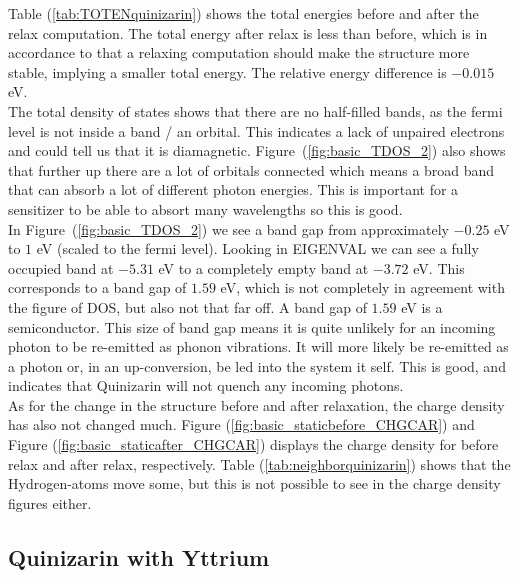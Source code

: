 \documentclass{article}
\begin{document}
    Table (\ref{tab:TOTENquinizarin}) shows the total energies before and after the relax computation. The total energy after relax is less than before, which is in accordance to that a relaxing computation should make the structure more stable, implying a smaller total energy. The relative energy difference is $-0.015$ eV. \\

    The total density of states shows that there are no half-filled bands, as the fermi level is not inside a band / an orbital. This indicates a lack of unpaired electrons and could tell us that it is diamagnetic. Figure~(\ref{fig:basic_TDOS_2}) also shows that further up there are a lot of orbitals connected which means a broad band that can absorb a lot of different photon energies. This is important for a sensitizer to be able to absort many wavelengths so this is good. \\

    In Figure~(\ref{fig:basic_TDOS_2}) we see a band gap from approximately $-0.25$ eV to $1$ eV (scaled to the fermi level). Looking in EIGENVAL we can see a fully occupied band at $-5.31$ eV to a completely empty band at $-3.72$ eV. This corresponds to a band gap of $1.59$ eV, which is not completely in agreement with the figure of DOS, but also not that far off. A band gap of $1.59$ eV is a semiconductor. This size of band gap means it is quite unlikely for an incoming photon to be re-emitted as phonon vibrations. It will more likely be re-emitted as a photon or, in an up-conversion, be led into the system it self. This is good, and indicates that Quinizarin will not quench any incoming photons. \\

    As for the change in the structure before and after relaxation, the charge density has also not changed much. Figure (\ref{fig:basic_staticbefore_CHGCAR}) and Figure (\ref{fig:basic_staticafter_CHGCAR}) displays the charge density for before relax and after relax, respectively. Table (\ref{tab:neighborquinizarin}) shows that the Hydrogen-atoms move some, but this is not possible to see in the charge density figures either. \\

  \subsection{Quinizarin with Yttrium}  \label{sec:discussionY}
\end{document}
